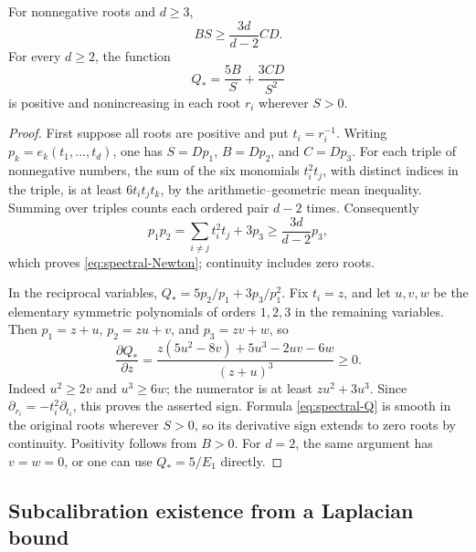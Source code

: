 \begin{lemma}
\label{lem:spectral-Newton-monotonicity}
For nonnegative roots and \(d\ge3\),
\begin{equation}\label{eq:spectral-Newton}
 BS\ge\frac{3d}{d-2}CD.
\end{equation}
For every \(d\ge2\), the function
\begin{equation}\label{eq:spectral-Q}
 Q_* =\frac{5B}{S}+\frac{3CD}{S^2}
\end{equation}
is positive and nonincreasing in each root \(r_i\) wherever
\(S>0\).
\end{lemma}

\begin{proof}
First suppose all roots are positive and put \(t_i=r_i^{-1}\).
Writing \(p_k=e_k(t_1,\ldots,t_d)\), one has
\(S=Dp_1\), \(B=Dp_2\), and \(C=Dp_3\).
For each triple of nonnegative numbers, the sum of the six monomials
\(t_i^2t_j\), with distinct indices in the triple, is at least
\(6t_it_jt_k\), by the arithmetic--geometric mean inequality.
Summing over triples counts each ordered pair \(d-2\) times.
Consequently
\[
 p_1p_2=\sum_{i\ne j}t_i^2t_j+3p_3
 \ge\frac{3d}{d-2}p_3,
\]
which proves \eqref{eq:spectral-Newton}; continuity includes zero roots.

In the reciprocal variables, \(Q_* =5p_2/p_1+3p_3/p_1^2\).
Fix \(t_i=z\), and let \(u,v,w\) be the elementary symmetric
polynomials of orders \(1,2,3\) in the remaining variables.
Then \(p_1=z+u\), \(p_2=zu+v\), and \(p_3=zv+w\), so
\begin{equation}\label{eq:spectral-Q-derivative}
 \frac{\partial Q_*}{\partial z}
 =\frac{z(5u^2-8v)+5u^3-2uv-6w}{(z+u)^3}\ge0.
\end{equation}
Indeed \(u^2\ge2v\) and \(u^3\ge6w\); the numerator is at least
\(zu^2+3u^3\).  Since \(\partial_{r_i}=-t_i^2\partial_{t_i}\),
this proves the asserted sign.  Formula \eqref{eq:spectral-Q}
is smooth in the original roots wherever \(S>0\), so its derivative
sign extends to zero roots by continuity.  Positivity follows from
\(B>0\).  For \(d=2\), the same argument has \(v=w=0\), or
one can use \(Q_*=5/E_1\) directly.
\end{proof}

\subsection{Subcalibration existence from a Laplacian bound}

